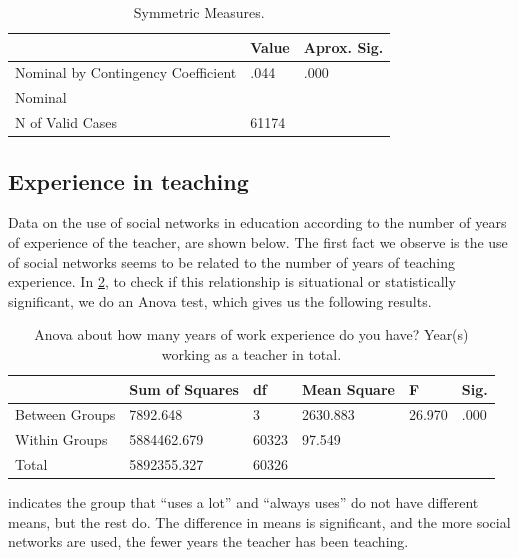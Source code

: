 \documentclass{textolivre}
\begin{document}
\begin{table}[htpb]
\caption{Symmetric Measures.}
\label{tbl-tabela-07}
\centering
\begin{tabular}{lll}
\toprule 
& Value & Aprox. Sig. \\
\midrule
Nominal by Contingency Coefficient & .044 & .000 \\ 
Nominal & & \\
N of Valid Cases & 61174 &  \\
\bottomrule
\end{tabular}
\end{table}

\subsection{Experience in teaching}\label{sec-experiencia}
Data on the use of social networks in education according to the number of years of experience of the teacher, are shown below. The first fact we observe is the use of social networks seems to be related to the number of years of teaching experience. In \cref{tbl-tabela-08}, to check if this relationship is situational or statistically significant, we do an Anova test, which gives us the following results.  

\begin{table}[htpb]
\caption{Anova about how many years of work experience do you have? Year(s) working as a teacher in total.}
\label{tbl-tabela-08}
\centering
\begin{tabular}{llllll}
\toprule 
& Sum of Squares & df & Mean Square & F & Sig. \\
\midrule
Between Groups & 7892.648 & 3 & 2630.883 & 26.970 & .000 \\ 
Within Groups & 5884462.679 & 60323 & 97.549 & &\\
Total & 5892355.327 & 60326 & & & \\
\bottomrule
\end{tabular}
\end{table}

 indicates the group that “uses a lot” and “always uses” do not have different means, but the rest do. The difference in means is significant, and the more social networks are used, the fewer years the teacher has been teaching.
\end{document}
